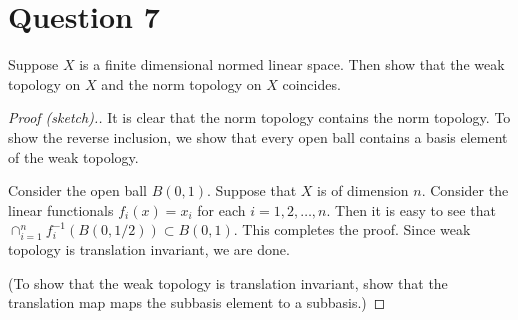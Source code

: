 \section{Question 7}
\horz

Suppose $X$ is a finite dimensional normed linear space. Then show that the weak topology on $X$ and the norm topology on $X$ coincides.

\horz
\begin{proof}[Proof (sketch).]
    It is clear that the norm topology contains the norm topology. To show the reverse inclusion, we show that every open ball contains a basis element of the weak topology.

    Consider the open ball $B\left( 0,1 \right)$. Suppose that $X$ is of dimension $n$. Consider the linear functionals $f_{i} (x) = x_{i}$ for each $i=1, 2, \ldots, n$. Then it is easy to see that $\cap_{i=1}^{n} f_{i}^{-1} \left( B\left( 0, 1/2 \right) \right) \subset B(0,1)$. This completes the proof. Since weak topology is translation invariant, we are done. 

(To show that the weak topology is translation invariant, show that the translation map maps the subbasis element to a subbasis.)
\end{proof}

